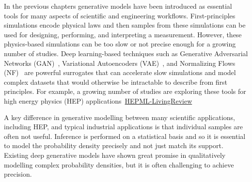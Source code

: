 In the previous chapters generative models have been introduced as essential tools for many aspects of scientific and engineering workflows. 
First-principles simulations encode physical laws and then samples from these simulations can be used for designing, performing, and interpreting a measurement. 
However, these physics-based simulations can be too slow or not precise enough for a growing number of studies. 
Deep learning-based techniques such as Generative Adversarial Networks (GAN)~\cite{goodfellow,Creswell2018}, Variational Autoencoders (VAE)~\cite{kingma2014autoencoding,Kingma2019}, and Normalizing Flows (NF)~\cite{10.5555/3045118.3045281,nflow_review} are powerful surrogates that can accelerate slow simulations and model complex datasets that would otherwise be intractable to describe from first principles. For example, a growing number of studies are exploring these tools for high energy physics (HEP) applications~\href{https://iml-wg.github.io/HEPML-LivingReview}{HEPML-LivingReview}%

A key difference in generative modelling between many scientific applications, including HEP, and typical industrial applications is that individual samples are often not useful. Inference is performed on a statistical basis and so it is essential to model the probability density precisely and not just match its support. 
Existing deep generative models have shown great promise in qualitatively modelling complex probability densities, but it is often challenging to achieve precision.

